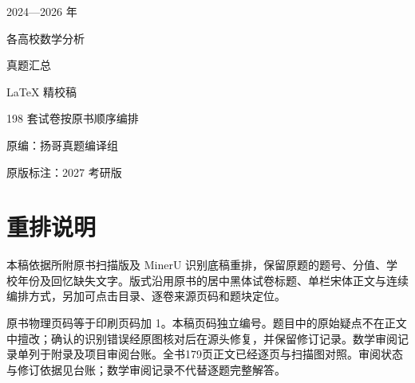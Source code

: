 \documentclass{examcollection}
\begin{document}
\begin{titlepage}
\centering
\vspace*{28mm}
{\heiti\LARGE 2024—2026 年\par}
\vspace{8mm}
{\heiti\Huge 各高校数学分析\par}
\vspace{5mm}
{\heiti\Huge 真题汇总\par}
\vspace{18mm}
{\Large LaTeX 精校稿\par}
\vspace{8mm}
198 套试卷\quad 按原书顺序编排\par
\vfill
原编：扬哥真题编译组\par
原版标注：2027 考研版\par
\vspace{12mm}
\end{titlepage}
\section*{重排说明}
本稿依据所附原书扫描版及 MinerU 识别底稿重排，保留原题的题号、分值、学校年份及回忆缺失文字。版式沿用原书的居中黑体试卷标题、单栏宋体正文与连续编排方式，另加可点击目录、逐卷来源页码和题块定位。

原书物理页码等于印刷页码加 1。本稿页码独立编号。题目中的原始疑点不在正文中擅改；确认的识别错误经原图核对后在源头修复，并保留修订记录。数学审阅记录单列于附录及项目审阅台账。全书179页正文已经逐页与扫描图对照。审阅状态与修订依据见台账；数学审阅记录不代替逐题完整解答。

\tableofcontents
\clearpage
{}

\clearpage

\end{document}
